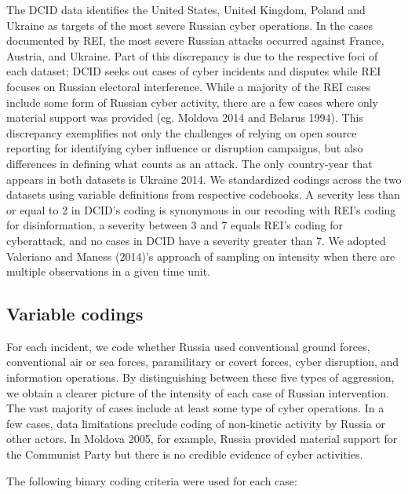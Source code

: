 \documentclass[
]{article}
\begin{document}
The DCID data identifies the United States, United Kingdom, Poland and
Ukraine as targets of the most severe Russian cyber operations. In the
cases documented by REI, the most severe Russian attacks occurred
against France, Austria, and Ukraine. Part of this discrepancy is due to
the respective foci of each dataset; DCID seeks out cases of cyber
incidents and disputes while REI focuses on Russian electoral
interference. While a majority of the REI cases include some form of
Russian cyber activity, there are a few cases where only material
support was provided (eg. Moldova 2014 and Belarus 1994). This
discrepancy exemplifies not only the challenges of relying on open
source reporting for identifying cyber influence or disruption
campaigns, but also differences in defining what counts as an attack.
The only country-year that appears in both datasets is Ukraine 2014. We
standardized codings across the two datasets using variable definitions
from respective codebooks. A severity less than or equal to 2 in DCID's
coding is synonymous in our recoding with REI's coding for
disinformation, a severity between 3 and 7 equals REI's coding for
cyberattack, and no cases in DCID have a severity greater than 7. We
adopted Valeriano and Maness (2014)'s approach of sampling on intensity
when there are multiple observations in a given time unit.

\hypertarget{variable-codings}{%
\subsection{Variable codings}\label{variable-codings}}

For each incident, we code whether Russia used conventional ground
forces, conventional air or sea forces, paramilitary or covert forces,
cyber disruption, and information operations. By distinguishing between
these five types of aggression, we obtain a clearer picture of the
intensity of each case of Russian intervention. The vast majority of
cases include at least some type of cyber operations. In a few cases,
data limitations preclude coding of non-kinetic activity by Russia or
other actors. In Moldova 2005, for example, Russia provided material
support for the Communist Party but there is no credible evidence of
cyber activities.

The following binary coding criteria were used for each case:
\end{document}
